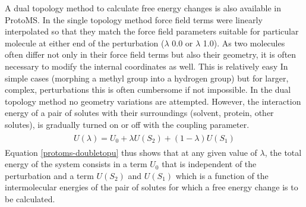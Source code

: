 \documentclass[letterpaper,10pt,english]{sphinxmanual}
\begin{document}
A dual topology method to calculate free energy changes is also available in ProtoMS. In the single topology method force field terms were linearly interpolated so that they match the force field parameters suitable for particular molecule at either end of the perturbation (\(\lambda\) 0.0 or \(\lambda\) 1.0). As two molecules often differ not only in their force field terms but also their geometry, it is often necessary to modify the internal coordinates as well. This is relatively easy In simple cases (morphing a methyl group into a hydrogen group) but for larger, complex, perturbations this is often cumbersome if not impossible. In the dual topology method no geometry variations are attempted. However, the interaction energy of a pair of solutes with their surroundings (solvent, protein, other solutes), is gradually turned on or off with the coupling parameter.
\label{protoms:equation-doubletopu}\begin{gather}
\begin{split}U(\lambda) = U_{0} + \lambda U(S_{2}) + (1 - \lambda) U(S_{1})\end{split}\label{protoms-doubletopu}
\end{gather}
Equation \eqref{protoms-doubletopu} thus shows that at any given value of \(\lambda\), the total energy of the system consists in a term \(U_{0}\) that is independent of the perturbation and a term \(U(S_{2})\) and \(U(S_{1})\) which is a function of the intermolecular energies of the pair of solutes for which a free energy change is to be calculated.
\end{document}
